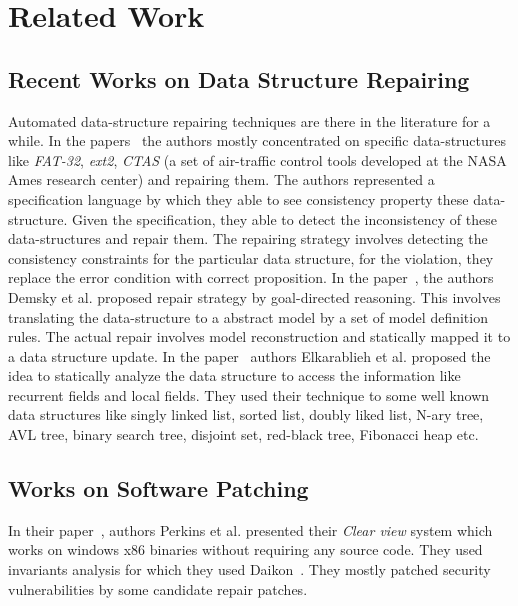 

\section{Related Work}
\label{sec:relatedWork}

\subsection{Recent Works on Data Structure Repairing}
\label{subsec:RecWorksDataStructure}

Automated data-structure repairing techniques are there in the literature for a
while. In the papers~\cite{
Demsky03automaticdata, conf/issre/DemskyR03,conf/oopsla/DemskyR03,
conf/issta/DemskyEGMPR06} the authors mostly concentrated on specific data-structures like \emph{FAT-32}, \emph{ext2},
\emph{CTAS} (a set of air-traffic control tools developed at the NASA Ames
research center) and repairing them. The authors represented a specification
language by which they able to see consistency property these data-structure.
Given the specification, they able to detect the inconsistency of these
data-structures and repair them.
The repairing strategy involves detecting the consistency constraints for the
particular data structure, for the violation, they replace the error condition
with correct proposition. In the paper~\cite{conf/icse/DemskyR05}, the authors
Demsky et al. proposed repair strategy by goal-directed reasoning. This involves
translating the data-structure to a abstract model by a set of model definition
rules. The actual repair involves model reconstruction and statically mapped it
to a data structure update. In the paper~\cite{conf/oopsla/2007} authors
Elkarablieh et al. proposed the idea to statically analyze the data structure to
access the information like recurrent fields and local fields. They used their
technique to some well known data structures like singly linked list, sorted
list, doubly liked list, N-ary tree, AVL tree, binary search tree, disjoint set,
red-black tree, Fibonacci heap etc.

\subsection{Works on Software Patching}
\label{subsec:RecWorksSoftPatch}

In their paper~\cite{conf/sosp/PerkinsKLABCPSSSWZER09}, authors Perkins et al.
presented their \emph{Clear view} system which works on windows x86 binaries
without requiring any source code. They used invariants analysis for which
they used Daikon~\cite{DBLP:journals/scp/ErnstPGMPTX07}. They mostly patched
security vulnerabilities by some candidate repair patches.

